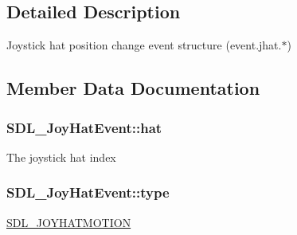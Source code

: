 \subsection{Detailed Description}
Joystick hat position change event structure (event.\+jhat.$\ast$) 

\subsection{Member Data Documentation}
\hypertarget{struct_s_d_l___joy_hat_event_ab1b54a6d1091e583e856f86b5af1e2f6}{}
\subsubsection[{hat}]{ S\+D\+L\+\_\+\+Joy\+Hat\+Event\+::hat}\label{struct_s_d_l___joy_hat_event_ab1b54a6d1091e583e856f86b5af1e2f6}
The joystick hat index \hypertarget{struct_s_d_l___joy_hat_event_ac583dafab46c44354e210a542aff57cc}{}
\subsubsection[{type}]{ S\+D\+L\+\_\+\+Joy\+Hat\+Event\+::type}\label{struct_s_d_l___joy_hat_event_ac583dafab46c44354e210a542aff57cc}
\hyperlink{_s_d_l__events_8h_a3b589e89be6b35c02e0dd34a55f3fccaafba4080bfbad335e520097b2024f0dff}{S\+D\+L\+\_\+\+J\+O\+Y\+H\+A\+T\+M\+O\+T\+I\+O\+N} \hypertarget{struct_s_d_l___joy_hat_event_a52b179a34407449941b61d988ca72ef4}{}
